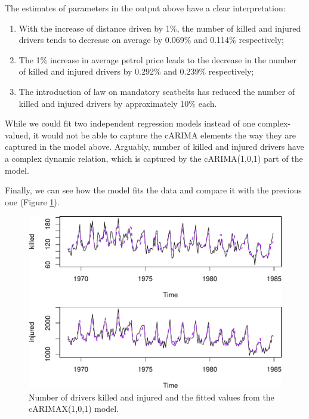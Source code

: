 \documentclass[
]{book}
\providecommand{\tightlist}{%
  \setlength{\itemsep}{0pt}\setlength{\parskip}{0pt}}
\begin{document}
The estimates of parameters in the output above have a clear interpretation:

\begin{enumerate}
\def\labelenumi{\arabic{enumi}.}
\tightlist
\item
  With the increase of distance driven by 1\%, the number of killed and injured drivers tends to decrease on average by 0.069\% and 0.114\% respectively;
\item
  The 1\% increase in average petrol price leads to the decrease in the number of killed and injured drivers by 0.292\% and 0.239\% respectively;
\item
  The introduction of law on mandatory seatbelts has reduced the number of killed and injured drivers by approximately 10\% each.
\end{enumerate}

While we could fit two independent regression models instead of one complex-valued, it would not be able to capture the cARIMA elements the way they are captured in the model above. Arguably, number of killed and injured drivers have a complex dynamic relation, which is captured by the cARIMA(1,0,1) part of the model.

Finally, we can see how the model fits the data and compare it with the previous one (Figure \ref{fig:seatbeltsDataModelFinal}).

\begin{figure}
\centering
\includegraphics{Svetunkov---Svetunkov---Complex-Valued-Econometrics_files/figure-latex/seatbeltsDataModelFinal-1.pdf}
\caption{\label{fig:seatbeltsDataModelFinal}Number of drivers killed and injured and the fitted values from the cARIMAX(1,0,1) model.}
\end{figure}
\end{document}

